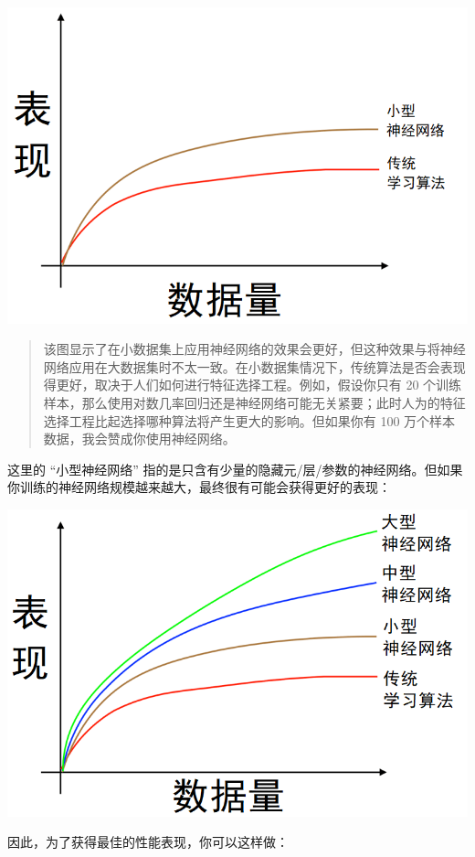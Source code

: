 \includegraphics{./img/ch04_02.png}

\begin{quote}
该图显示了在小数据集上应用神经网络的效果会更好，但这种效果与将神经网络应用在大数据集时不太一致。在小数据集情况下，传统算法是否会表现得更好，取决于人们如何进行特征选择工程。例如，假设你只有
20
个训练样本，那么使用对数几率回归还是神经网络可能无关紧要；此时人为的特征选择工程比起选择哪种算法将产生更大的影响。但如果你有
100 万个样本数据，我会赞成你使用神经网络。
\end{quote}

这里的 ``小型神经网络''
指的是只含有少量的隐藏元/层/参数的神经网络。但如果你训练的神经网络规模越来越大，最终很有可能会获得更好的表现：

\includegraphics{./img/ch04_03.png}

因此，为了获得最佳的性能表现，你可以这样做：

